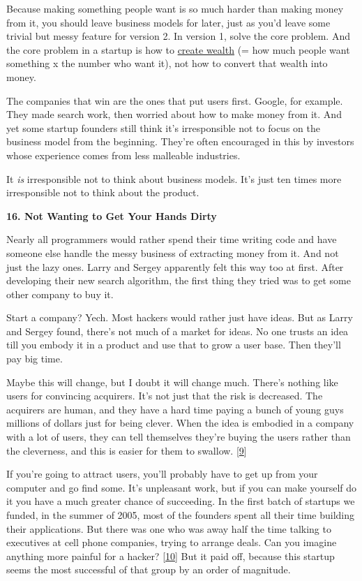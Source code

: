 Because making something people want is so much harder than making money
from it, you should leave business models for later, just as you'd leave
some trivial but messy feature for version 2. In version 1, solve the
core problem. And the core problem in a startup is how to
\href{wealth.html}{create wealth} (= how much people want something x
the number who want it), not how to convert that wealth into money.

The companies that win are the ones that put users first. Google, for
example. They made search work, then worried about how to make money
from it. And yet some startup founders still think it's irresponsible
not to focus on the business model from the beginning. They're often
encouraged in this by investors whose experience comes from less
malleable industries.

It \emph{is} irresponsible not to think about business models. It's just
ten times more irresponsible not to think about the product.

\textbf{16. Not Wanting to Get Your Hands Dirty}

Nearly all programmers would rather spend their time writing code and
have someone else handle the messy business of extracting money from it.
And not just the lazy ones. Larry and Sergey apparently felt this way
too at first. After developing their new search algorithm, the first
thing they tried was to get some other company to buy it.

Start a company? Yech. Most hackers would rather just have ideas. But as
Larry and Sergey found, there's not much of a market for ideas. No one
trusts an idea till you embody it in a product and use that to grow a
user base. Then they'll pay big time.

Maybe this will change, but I doubt it will change much. There's nothing
like users for convincing acquirers. It's not just that the risk is
decreased. The acquirers are human, and they have a hard time paying a
bunch of young guys millions of dollars just for being clever. When the
idea is embodied in a company with a lot of users, they can tell
themselves they're buying the users rather than the cleverness, and this
is easier for them to swallow. {[}\hyperref[f9n]{9}{]}

If you're going to attract users, you'll probably have to get up from
your computer and go find some. It's unpleasant work, but if you can
make yourself do it you have a much greater chance of succeeding. In the
first batch of startups we funded, in the summer of 2005, most of the
founders spent all their time building their applications. But there was
one who was away half the time talking to executives at cell phone
companies, trying to arrange deals. Can you imagine anything more
painful for a hacker? {[}\hyperref[f10n]{10}{]} But it paid off, because
this startup seems the most successful of that group by an order of
magnitude.

